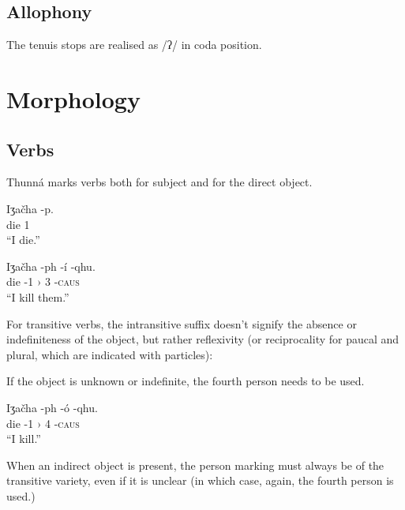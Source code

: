 \documentclass[11pt]{article} %
\begin{document}
	\subsection{Allophony}
	The tenuis stops are realised as /ʔ/ in coda position.


\section{Morphology}

\subsection{Verbs}

Thunná marks verbs both for subject and for the direct object.

\begin{exe}
  \ex
  \gll Iʒačha  -p.\\
	   die     \textsc{1} \\
  \glt ``I die.''
  
  \ex
  \gll Iʒačha  -ph -í -qhu.\\
	   die     -\textsc{1 ›} \textsc{3} -\textsc{caus} \\
  \glt ``I kill them.''
\end{exe}

For transitive verbs, the intransitive suffix doesn't signify the absence or indefiniteness of the object, but rather reflexivity (or reciprocality for paucal and plural, which are indicated with particles):

\begin{exe}    
\end{exe}

If the object is unknown or indefinite, the fourth person needs to be used.
  
\begin{exe}  
  \ex
  \gll Iʒačha  -ph -ó -qhu.\\
	   die     -\textsc{1 ›} \textsc{4} -\textsc{caus} \\
  \glt ``I kill.''
\end{exe}

When an indirect object is present, the person marking must always be of the transitive variety, even if it is unclear (in which case, again, the fourth person is used.)
	
\end{document}
